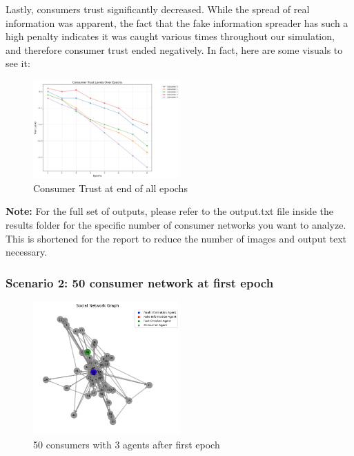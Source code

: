 \documentclass[twoside]{article}
\begin{document}
 Lastly, consumers trust significantly decreased. While the spread of real information was apparent, the fact that the fake information spreader has such a high penalty indicates it was caught various times throughout our simulation, and therefore consumer trust ended negatively. In fact,  here are some visuals to see it:

\begin{figure}[htbp]
     \centering
     \includegraphics[width=0.5\textwidth]{../results/images/consumertrust.png}
     \caption{Consumer Trust at end of all epochs}
     \label{fig: 52 consumer, 3 agents}
 \end{figure}

\textbf{Note:} For the full set of outputs, please refer to the output.txt file inside the results folder for the specific number of consumer networks you want to analyze. This is shortened for the report to reduce the number of images and output text necessary.

\subsubsection{Scenario 2: 50 consumer network at first epoch}
\begin{figure}[htbp]
     \centering
     \includegraphics[width=0.5\textwidth]{../results/50consumer/50_initial.png}
     \caption{50 consumers with 3 agents after first epoch}
     \label{fig: 50 consumer, 3 agents}
 \end{figure}
\end{document}
